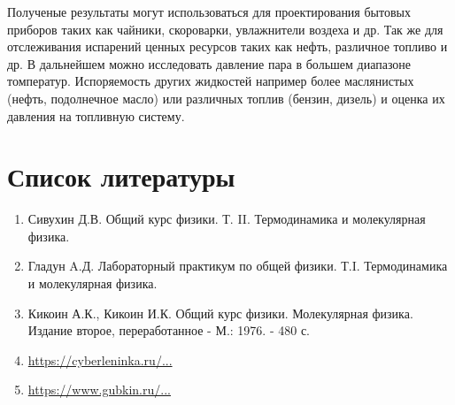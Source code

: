 \documentclass[a4paper,10pt]{article} %
\begin{document}
	Полученые результаты могут использоваться для проектирования бытовых приборов таких как чайники, скороварки, 
	увлажнители воздеха и др. Так же для отслеживания испарений ценных ресурсов таких как нефть, различное топливо и др. 
	В дальнейшем можно исследовать давление пара в большем диапазоне томператур. Испоряемость других жидкостей 
	например более маслянистых (нефть,   подолнечное масло) или различных топлив (бензин, дизель) и оценка их давления 
	на топливную систему.

\section{Список литературы}
	\begin{enumerate}
		\item Сивухин Д.В. Общий курс физики. Т. II. Термодинамика и молекулярная физика.
		\item Гладун A.Д. Лабораторный практикум по общей физики. Т.I. Термодинамика и молекулярная физика.
		\item Кикоин А.К., Кикоин И.К. Общий курс физики. Молекулярная физика. Издание второе, переработанное - М.: 1976. - 480 с.
		\item \href{https://cyberleninka.ru/article/n/issledovanie-temperaturnoy-zavisimosti-skorosti-ispareniya-zhidkostey-so-svobodnoy-poverhnosti-i-skorosti-kipeniya-zhidkosti-na/viewer}{https://cyberleninka.ru/...}
		\item \href{https://www.gubkin.ru/faculty/chemical_and_environmental/chairs_and_departments/physical_and_colloid_chemistry/files/fazovoye_ravnovesiye.pdf}{https://www.gubkin.ru/...}
	\end{enumerate}
\end{document}
